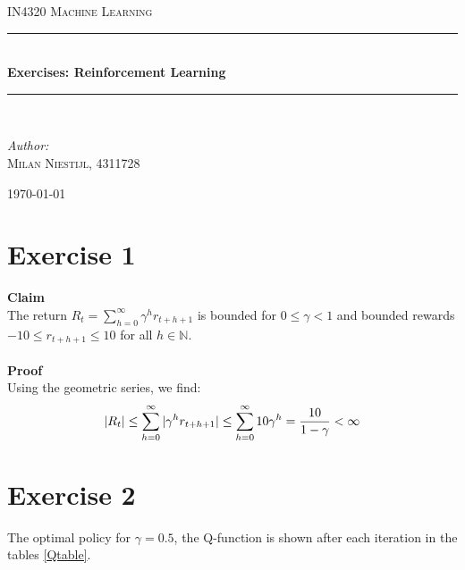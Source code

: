 \documentclass [a4paper] {report}
\begin{document}
	
	\begin{titlepage}
		\begin{center}
			
			\textsc{\LARGE IN4320 Machine Learning}\\[1.25cm]
			
			\rule{\linewidth}{0.5mm}\\[1.0cm]
			{\huge \bfseries Exercises: Reinforcement Learning }\\[0.6cm]
			\rule{\linewidth}{0.5mm}\\[1.5cm]
			
			\begin{minipage}{0.4\textwidth}
				\begin{flushleft} \large	
					\emph{Author:}\\
					\textsc{Milan Niestijl, 4311728}
				\end{flushleft}
			\end{minipage}
			
			\vfill
			{\large \today}
		\end{center}
	\end{titlepage}
	
	\section*{Exercise 1}
	\textbf{Claim}\\
	The return $R_{t} = \sum_{h=0}^{\infty}\gamma^{h}r_{t+h+1}$ is bounded for $0\leq \gamma<1$ and bounded rewards $-10\leq r_{t+h+1}\leq 10$ for all $h\in \mathbb{N}$.\\\\
	\textbf{Proof}\\
	Using the geometric series, we find:
	$$|R_{t}| \leq \sum_{h=0}^{\infty}|\gamma^{h}r_{t+h+1}| \leq \sum_{h=0}^{\infty}10 \gamma^{h} = {10 \over 1-\gamma} < \infty$$
	
	\section*{Exercise 2}
	The optimal policy for $\gamma=0.5$, the Q-function is shown after each iteration in the tables \ref{Qtable}.
	
\end{document}
